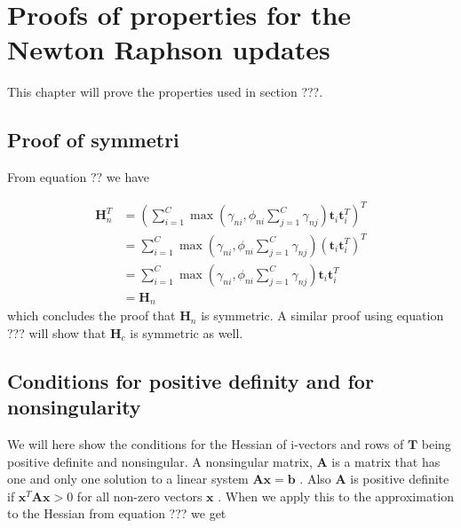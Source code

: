 \chapter{Proofs of properties for the Newton Raphson updates}

This chapter will prove the properties used in section ???. 


\section{Proof of symmetri}
\label{symproof}

From equation ?? we have

\begin{align*}
\mathbf{H}_n^T &= \left(\sum_{i=1}^{C}\max(\gamma_{ni}, \phi_{ni}\sum_{j=1}^{C}\gamma_{nj})\mathbf{t}_i\mathbf{t}_i^T\right)^T \\
 &= \sum_{i=1}^{C}\max(\gamma_{ni}, \phi_{ni}\sum_{j=1}^{C}\gamma_{nj})\left(\mathbf{t}_i\mathbf{t}_i^T\right)^T \\
 &= \sum_{i=1}^{C}\max(\gamma_{ni}, \phi_{ni}\sum_{j=1}^{C}\gamma_{nj})\mathbf{t}_i\mathbf{t}_i^T \\
 &= \mathbf{H}_n
\end{align*}
which concludes the proof that $\mathbf{H}_n$ is symmetric. A similar proof using equation ??? will show that $\mathbf{H}_c$ is symmetric as well.




\section{Conditions for positive definity and for nonsingularity}
\label{posdefproof}
We will here show the conditions for the Hessian of i-vectors and rows of $\mathbf{T}$ being positive definite and nonsingular. A nonsingular matrix, $\mathbf{A}$ is a matrix that has one and only one solution to a linear system $\mathbf{Ax}=\mathbf{b}$ \cite[p. 54]{matte3}. Also $\mathbf{A}$ is positive definite if $\mathbf{x}^T\mathbf{Ax} > 0$ for all non-zero vectors $\mathbf{x}$ \cite[p. 246]{matte3}. When we apply this to the approximation to the Hessian from equation ??? we get

